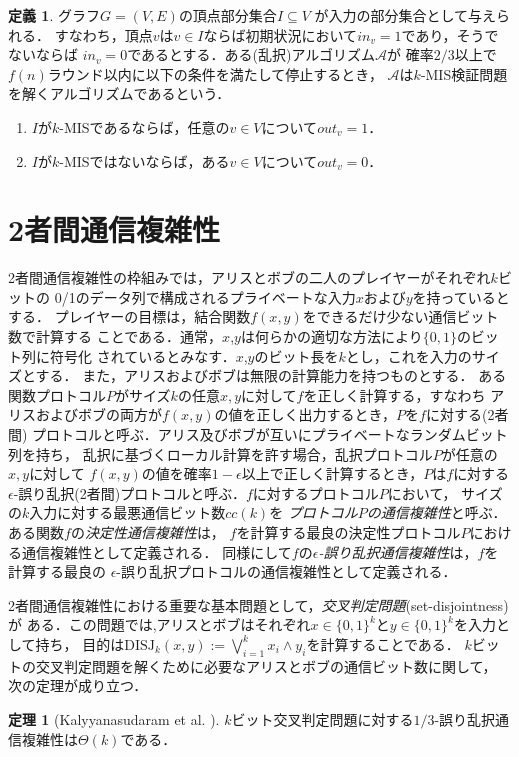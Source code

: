 \documentclass[12pt]{thesis}
\newcommand{\Inp}{\mathit{in}}
\newcommand{\Out}{\mathit{out}}
\theoremstyle{definition}
\newtheorem{theorem}{定理}[chapter]
\newtheorem{definition}{定義}[chapter]
\begin{document}
\begin{definition}
グラフ$G=(V,E)$の頂点部分集合$I \subseteq V$ が入力の部分集合として与えられる．
すなわち，頂点$v$は$v\in I$ならば初期状況において$\Inp_v = 1$であり，そうでないならば
$\Inp_v = 0$であるとする．ある(乱択)アルゴリズム$\mathcal{A}$が
確率$2/3$以上で$f(n)$ラウンド以内に以下の条件を満たして停止するとき，
$\mathcal{A}$は$k$-MIS検証問題を解くアルゴリズムであるという．
\begin{enumerate}
\item $I$が$k$-MISであるならば，任意の$v \in V$について$\Out_v = 1$．
\item $I$が$k$-MISではないならば，ある$v \in V$について$\Out_v = 0$．
\end{enumerate}
\end{definition}

\section{2者間通信複雑性}
2者間通信複雑性の枠組みでは，アリスとボブの二人のプレイヤーがそれぞれ$k$ビットの
0/1のデータ列で構成されるプライベートな入力$x$および$y$を持っているとする．
プレイヤーの目標は，結合関数$f(x,y)$をできるだけ少ない通信ビット数で計算する
ことである．通常，$x$,$y$は何らかの適切な方法により$\{0,1\}$のビット列に符号化
されているとみなす．$x$,$y$のビット長を$k$とし，これを入力のサイズとする．
また，アリスおよびボブは無限の計算能力を持つものとする．
ある関数プロトコル$P$がサイズ$k$の任意$x, y$に対して$f$を正しく計算する，すなわち
アリスおよびボブの両方が$f(x,y)$の値を正しく出力するとき，$P$を$f$に対する(2者間)
プロトコルと呼ぶ．アリス及びボブが互いにプライベートなランダムビット列を持ち，
乱択に基づくローカル計算を許す場合，乱択プロトコル$P$が任意の$x, y$に対して
$f(x,y)$の値を確率$1-\epsilon$以上で正しく計算するとき，$P$は$f$に対する
$\epsilon$-誤り乱択(2者間)プロトコルと呼ぶ．$f$に対するプロトコル$P$において，
サイズの$k$入力に対する最悪通信ビット数$\mathit{cc}(k)$を
\emph{プロトコル$P$の通信複雑性}と呼ぶ．ある関数$f$の\emph{決定性通信複雑性}は，
$f$を計算する最良の決定性プロトコル$P$における通信複雑性として定義される．
同様にして$f$の\emph{$\epsilon$-誤り乱択通信複雑性}は，$f$を計算する最良の
$\epsilon$-誤り乱択プロトコルの通信複雑性として定義される．

2者間通信複雑性における重要な基本問題として，\emph{交叉判定問題}(set-disjointness)が
ある．この問題では,アリスとボブはそれぞれ$x \in \{0, 1\}^{k}$と$y \in \{0, 1\}^{k}$を入力として持ち，
目的は$\mathrm{DISJ}_{k} (x, y) :=\bigvee_{i = 1}^{k} x_{i} \land y_{i}$を計算することである．
$k$ビットの交叉判定問題を解くために必要なアリスとボブの通信ビット数に関して，
次の定理が成り立つ．
\begin{theorem}[Kalyyanasudaram et al. \cite{kalyanasundaram1992probabilistic}] \label{thm:disjointness}
$k$ビット交叉判定問題に対する$1/3$-誤り乱択通信複雑性は$\Theta(k)$である．
\end{theorem}
\end{document}
